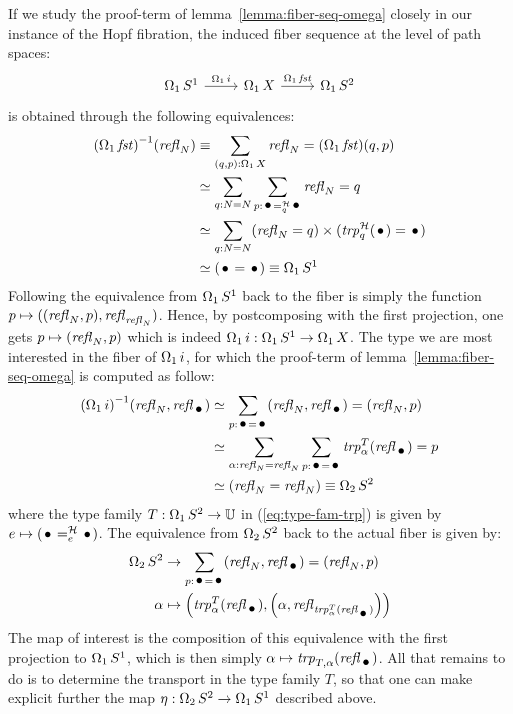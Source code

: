 \documentclass[english,a4]{article}
\def\U{\universe U}%
\begin{document}
If we study the proof-term of lemma~\ref{lemma:fiber-seq-omega}
closely in our instance of the Hopf fibration, the induced fiber
sequence at the level of path spaces:
\begin{equation}
  \label{eq:12}
  \begin{tikzcd}
    \loopspace 1 \Sc \rar["\loopspace 1 i"] & \loopspace 1 X \rar["\loopspace 1 \fst"] & \loopspace 1 \Sp
  \end{tikzcd}
\end{equation}
is obtained through the following equivalences:
\begin{align}
  \inv {(\loopspace 1 \fst)} {(\refl N)}
  &\jdeq \sum_{(q,p):\loopspace 1 X}\refl N = (\loopspace 1 \fst)(q,p)
  \\
  &\weq \sum_{q:N=N}\sum_{p:\pathover \base {\hopffam} q \base}\refl N = q
  \\
  &\weq \sum_{q:N=N}(\refl N = q)\times(\trp[\hopffam]{q} (\base) =\base)
  \\
  &\weq (\base = \base) \jdeq \loopspace 1 \Sc
\end{align}
Following the equivalence from $\operatorname{\Omega_{1}} {S^1}$ back to the fiber is
simply the function $p \mapsto ((\mathop{{\mathit{refl}}_{N}},p),\mathop{{\mathit{refl}}_{\mathop{{\mathit{refl}}_{N}}}})$. Hence,
by postcomposing with the first projection, one gets
$p \mapsto (\mathop{{\mathit{refl}}_{N}}, p)$ which is indeed
$\operatorname{\Omega_{1}} i: \operatorname{\Omega_{1}} {S^1} \to \operatorname{\Omega_{1}} X$. The type we are
most interested in the fiber of $\operatorname{\Omega_{1}} i$, for which the
proof-term of lemma~\ref{lemma:fiber-seq-omega} is computed as follow:
\begin{align}
  \inv {(\loopspace 1 i)} {(\refl N,\refl\base)}
  &\weq \sum_{p:\base = \base}(\refl N,\refl\base) = (\refl N,p)
  \\
  &\weq \sum_{\alpha:\refl N = \refl N}\sum_{p:\base=\base}\trp [T]{\alpha}(\refl \base)
 = p \label{eq:type-fam-trp}
  \\
  &\weq (\refl N = \refl N) \jdeq \loopspace 2 \Sp
\end{align}
where the type family $T:\loopspace 1 \Sp \to \U$ in
(\ref{eq:type-fam-trp}) is given by
$e\mapsto {(\pathover \base \hopffam e \base)}$. The equivalence from
$\operatorname{\Omega_{2}} S^2$ back to the actual fiber is given by:
\begin{equation}
  \begin{aligned}
    \loopspace 2 \Sp &\to \sum_{p:\base = \base}(\refl N,\refl\base) =
    (\refl N,p)
    \\
    \alpha &\mapsto \left(\trp[T]{\alpha}(\refl\base), \left(\alpha,
        \refl{\trp[T]{\alpha}(\refl\base)}\right)\right)
  \end{aligned}
\end{equation}
The map of interest is the composition of this equivalence with the
first projection to $\operatorname{\Omega_{1}} {S^1}$, which is then simply
$\alpha \mapsto \trp{T,\alpha}(\refl \base)$. All that remains to do
is to determine the transport in the type family $T$, so that one can
make explicit further the map $\eta:\operatorname{\Omega_{2}} S^2 \to \operatorname{\Omega_{1}} {S^1}$
described above.
\end{document}
